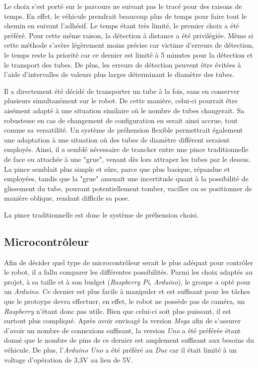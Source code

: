 \documentclass[a4paper,11pt]{article}
\begin{document}
Le choix s'est porté sur le parcours ne suivant pas le tracé pour des raisons de temps. En effet, le véhicule prendrait beaucoup plus de temps pour faire tout le chemin en suivant l'adhésif. Le temps étant très limité, le premier choix a été préféré. Pour cette même raison, la détection à distance a été privilégiée. Même si cette méthode s'avère légèrement moins précise car victime d'erreurs de détection, le temps reste la priorité car ce dernier est limité à 5 minutes pour la détection et le transport des tubes. De plus, les erreurs de détection peuvent être évitées à l'aide d'intervalles de valeurs plus larges déterminant le diamètre des tubes.

Il a directement été décidé de transporter un tube à la fois, sans en conserver plusieurs simultanément sur le robot. De cette manière, celui-ci pourrait être aisément adapté à une situation similaire où le nombre de tubes changerait. Sa robustesse en cas de changement de configuration en serait ainsi accrue, tout comme sa versatilité. Un système de préhension flexible permettrait également une adaptation à une situation où des tubes de diamètre différent seraient employés. Ainsi, il a semblé nécessaire de trancher entre une pince traditionnelle de face ou attachée à une "grue", venant dès lors attraper les tubes par le dessus. La pince semblait plus simple et sûre, parce que plus basique, répandue et employées, tandis que la "grue" amenait une incertitude quant à la possibilité de glissement du tube, pouvant potentiellement tomber, vaciller ou se positionner de manière oblique, rendant difficile sa pose.

La pince traditionnelle est donc le système de préhension choisi.


\subsection{Microcontrôleur}

Afin de décider quel type de microcontrôleur serait le plus adéquat pour contrôler le robot, il a fallu comparer les différentes possibilités. Parmi les choix adaptés au projet, à sa taille et à son budget (\textit{Raspberry Pi}, \textit{Arduino}), le groupe a opté pour un \textit{Arduino}. Ce dernier est plus facile à manipuler et est suffisant pour les tâches que le protoype devra effectuer, en effet, le robot ne possède pas de caméra, un \textit{Raspberry} n'étant donc pas utile. Bien que celui-ci soit plus puissant, il est surtout plus compliqué. Après avoir envisagé la version \textit{Mega} afin de s'assurer d'avoir un nombre de connexions suffisant, la version \textit{Uno} a été préférée étant donné que le nombre de pins de ce dernier est amplement suffisant aux besoins du véhicule. De plus, l'\textit{Arduino Uno} a été préféré au \textit{Due} car il était limité à un voltage d’opération de 3,3V au lieu de 5V.
\end{document}
